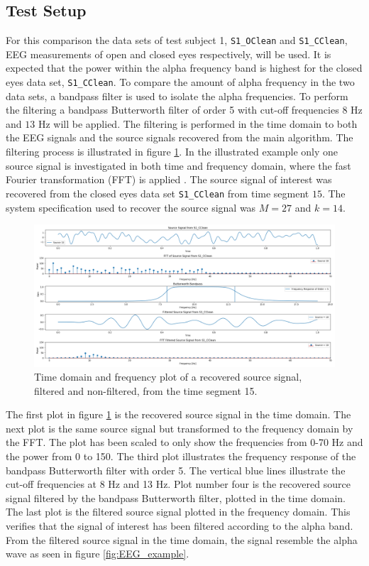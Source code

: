 \subsection{Test Setup}
For this comparison the data sets of test subject 1, \texttt{S1\_OClean} and \texttt{S1\_CClean}, EEG measurements of open and closed eyes respectively, will be used. 
It is expected that the power within the alpha frequency band is highest for the closed eyes data set, \texttt{S1\_CClean}.
To compare the amount of alpha frequency in the two data sets, a bandpass filter is used to isolate the alpha frequencies. 
To perform the filtering a bandpass Butterworth filter of order 5 with cut-off frequencies $8$ Hz and $13$ Hz will be applied. 
The filtering is performed in the time domain to both the EEG signals and the source signals recovered from the main algorithm.
The filtering process is illustrated in figure \ref{fig:dft_1}.
In the illustrated example only one source signal is investigated in both time and frequency domain, where the fast Fourier transformation (FFT) is applied \cite[Chapter 9]{FFT}. 
The source signal of interest was recovered from the closed eyes data set \texttt{S1\_CClean} from time segment $15$. 
The system specification used to recover the source signal was $M = 27$ and $k = 14$.
\begin{figure}[H]
\centering
\includegraphics[scale=0.28]{figures/ch_7/DFT_plot_X_timeseg15_source10.png}
\caption{Time domain and frequency plot of a recovered source signal, filtered and non-filtered, from the time segment 15.}
\label{fig:dft_1}
\end{figure}
\noindent
The first plot in figure \ref{fig:dft_1} is the recovered source signal in the time domain. 
The next plot is the same source signal but transformed to the frequency domain by the FFT. 
The plot has been scaled to only show the frequencies from 0-70 Hz and the power from 0 to 150. 
The third plot illustrates the frequency response of the bandpass Butterworth filter with order 5. 
The vertical blue lines illustrate the cut-off frequencies at 8 Hz and 13 Hz.
Plot number four is the recovered source signal filtered by the bandpass Butterworth filter, plotted in the time domain. 
The last plot is the filtered source signal plotted in the frequency domain. 
This verifies that the signal of interest has been filtered according to the alpha band. 
From the filtered source signal in the time domain, the signal resemble the alpha wave as seen in figure \ref{fig:EEG_example}.

